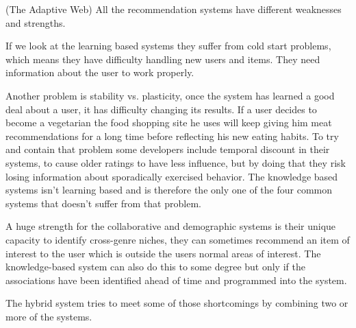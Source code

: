 (The Adaptive Web)
All the recommendation systems have different weaknesses and strengths.

If we look at the learning based systems they suffer from cold start problems, which means they have difficulty handling new users and items. They need information about the user to work properly.

Another problem is stability vs. plasticity, once the system has learned a good deal about a user, it has difficulty changing its results. If a user decides to become a vegetarian the food shopping site he uses will keep giving him meat recommendations for a long time before reflecting his new eating habits. To try and contain that problem some developers include temporal discount in their systems, to cause older ratings to have less influence, but by doing that they risk losing information about sporadically exercised behavior. The knowledge based systems isn't learning based and is therefore the only one of the four common systems that doesn't suffer from that problem.

A huge strength for the collaborative and demographic systems is their unique capacity to identify cross-genre niches, they can sometimes recommend an item of interest to the user which is outside the users normal areas of interest. The knowledge-based system can also do this to some degree but only if the associations have been identified ahead of time and programmed into the system.

The hybrid system tries to meet some of those shortcomings by combining two or more of the systems. 
